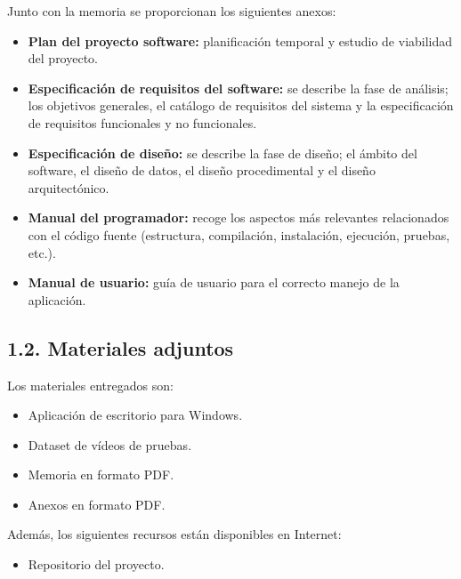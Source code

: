 Junto con la memoria se proporcionan los siguientes anexos:
\begin{itemize}
	\item \textbf{Plan del proyecto software:} planificación temporal y estudio de viabilidad del proyecto.
	\item \textbf{Especificación de requisitos del software:} se describe la fase de análisis; los objetivos generales, el catálogo de requisitos del sistema y la especificación de requisitos funcionales y no funcionales.
	\item \textbf{Especificación de diseño:} se describe la fase de diseño; el ámbito
del software, el diseño de datos, el diseño procedimental y el diseño arquitectónico.
	\item \textbf{Manual del programador:} recoge los aspectos más relevantes relacionados
con el código fuente (estructura, compilación, instalación, ejecución, pruebas, etc.).
	\item \textbf{Manual de usuario:} guía de usuario para el correcto manejo de la
aplicación.
\end{itemize}


\subsection{1.2. Materiales adjuntos}

Los materiales entregados son:
\begin{itemize}
	\item Aplicación de escritorio para Windows.
	\item Dataset de vídeos de pruebas.
	\item Memoria en formato PDF.
	\item Anexos en formato PDF.
\end{itemize}

Además, los siguientes recursos están disponibles en Internet:
\begin{itemize}
	\item Repositorio del proyecto.
\end{itemize}